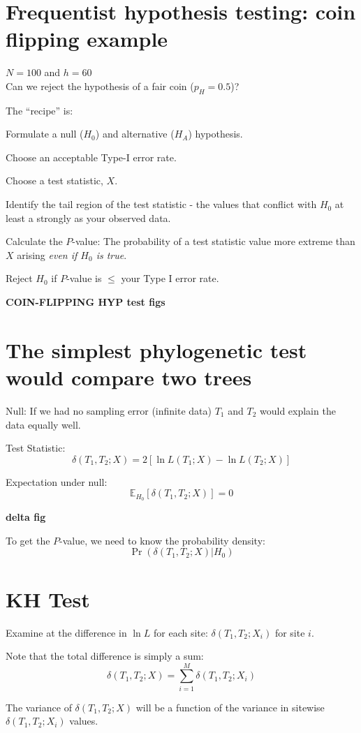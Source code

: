 \documentclass[landscape]{foils}
\begin{document}
\myNewSlide
\section*{Frequentist hypothesis testing: coin flipping example}
$N=100$ and $h=60$\\
Can we reject the hypothesis of a fair coin ($p_H = 0.5$)?

The ``recipe'' is:
\begin{compactenum}
	\item Formulate a null ($H_0$) and alternative ($H_A$) hypothesis.
	\item Choose an acceptable Type-I error rate.
	\item Choose a test statistic, $X.$
	\item Identify the tail region of the test statistic - the values that conflict with $H_0$ at least a strongly as your observed data.
	\item Calculate the $P$-value: The probability of a test statistic value more extreme than $X$ arising {\em even if $H_0$  is true}.
	\item Reject $H_0$ if $P$-value is $\leq$ your Type I error rate.
\end{compactenum}

\myNewSlide
{\bf COIN-FLIPPING HYP test figs}

\myNewSlide
\section*{The simplest phylogenetic test would compare two trees}
\Large
Null: If we had no sampling error (infinite data) $T_1$ and $T_2$ would explain the data equally well. 

Test Statistic: $$\delta(T_1,T_2;X) = 2\left[\ln L(T_1;X) - \ln L(T_2;X)\right]$$

Expectation under null: $$\mathbb{E}_{H_0}\left[\delta(T_1,T_2;X)\right] = 0$$

\myNewSlide
{\bf delta fig}

To get the $P$-value, we need to know the probability density: $$\Pr(\delta(T_1,T_2;X)|H_0)$$

\myNewSlide
\section*{KH Test}
\begin{compactenum}
	\item Examine at the difference in $\ln L$ for each site: $\delta(T_1,T_2;X_i)$ for site $i$.
	\item Note that the total difference is simply a sum:
		$$\delta(T_1,T_2;X) = \sum_{i=1}^M\delta(T_1,T_2;X_i)$$
	\item The variance of $\delta(T_1,T_2;X)$ will be a function of the variance in sitewise $\delta(T_1,T_2;X_i)$ values.
\end{compactenum}
\end{document}
